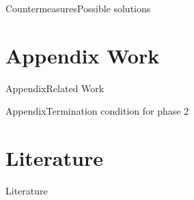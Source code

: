 \documentclass[aspectratio=169, hyperref={colorlinks=true, allcolors=SecondaryColor}, c]{beamer}
\begin{document}
\begin{frame}[fragile]{Countermeasures}{Possible solutions}
\end{frame}

\section{Appendix Work}

\begin{frame}[fragile]{Appendix}{Related Work}
\end{frame}

\begin{frame}[fragile]{Appendix}{Termination condition for phase 2}
\end{frame}

\section{Literature}

\begin{frame}[allowframebreaks]{Literature}
	\printbibliography
\end{frame}
%
%


\end{document}
